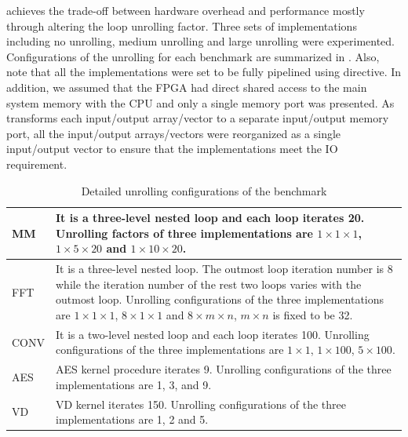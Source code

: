 \autoesl achieves the trade-off between hardware overhead and performance mostly through altering the loop unrolling factor. Three sets of implementations including no unrolling, medium unrolling and large unrolling were experimented. Configurations of the unrolling for each benchmark are summarized in . Also, note that all the implementations were set to be fully pipelined using \autoesl directive. In addition, we assumed that the FPGA had direct shared access to the main system memory with the CPU and only a single memory port was presented. As \autoesl transforms each input/output array/vector to a separate input/output memory port, all the input/output arrays/vectors were reorganized as a single input/output vector to ensure that the implementations meet the IO requirement. 
 
\begin{table}[h]
\vspace{-1em}
\caption{Detailed unrolling configurations of the benchmark}
\label{tab:urconfig}
\centering
\small
\begin{tabular}{|p{1cm}|p{6.5cm}|}
\hline
MM & {It is a three-level nested loop and each loop iterates 20. Unrolling factors of three implementations are  $1 \times 1 \times 1$, $1 \times 5 \times 20$ and $1 \times 10 \times 20$.
}\\

\hline
FFT & {It is a three-level nested loop. The outmost loop iteration number is 8 while the iteration number of the rest two loops varies with the outmost loop. Unrolling configurations of the three implementations are $1 \times 1 \times 1$, $8 \times 1 \times 1$ and $8 \times m \times n$, $m \times n$ is fixed to be 32. 
}\\

\hline
CONV & {It is a two-level nested loop and each loop iterates 100. Unrolling configurations of the three implementations are $1 \times 1$, $1 \times 100$, $5 \times 100$.}\\

\hline
AES & {AES kernel procedure iterates 9. Unrolling configurations of the three implementations are 1, 3, and 9.
}\\

\hline
VD & {VD kernel iterates 150. Unrolling configurations of the three implementations are 1, 2 and 5.}\\

\hline
\end{tabular}
\vspace{-1em}
\end{table}

